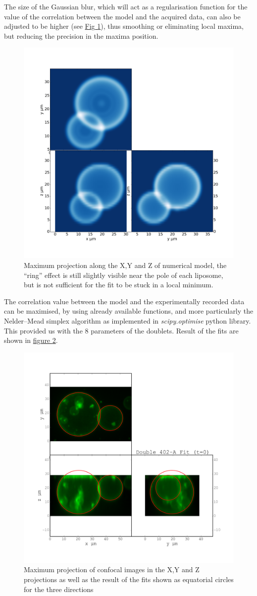 \documentclass[A4paperpaper,11pt,english]{sphinxmanual}
\begin{document}
The size of the
Gaussian blur, which will act as a regularisation
function for the value of the correlation between the model and the acquired
data, can also be adjusted to be higher (see \hyperref[parts/part4:max-proj-model]{Fig  \ref*{parts/part4:max-proj-model}}), thus smoothing or eliminating local maxima,
but reducing the precision in the maxima position.
\begin{figure}[htbp]
\centering
\capstart

\includegraphics[width=0.500\linewidth]{max_proj_model.png}
\caption{Maximum projection along the X,Y and Z of numerical model, the ``ring'' effect
is still slightly visible near the pole of each liposome, but is not
sufficient for the fit to be stuck in a local minimum.}\label{parts/part4:max-proj-model}\end{figure}

The correlation value between the model and the experimentally recorded
data can be maximised, by using already available functions, and more particularly the Nelder–Mead simplex algorithm as implemented in \emph{scipy.optimise} python library. This
provided us with the 8 parameters of the doublets. Result of the fits are shown in
\hyperref[parts/part4:fig-fit-t0]{figure  \ref*{parts/part4:fig-fit-t0}}.
\begin{figure}[htbp]
\centering
\capstart

\includegraphics[width=0.500\linewidth]{Doublet-402-A-Fit-t-0.png}
\caption{Maximum projection of confocal images in the X,Y and Z projections as well
as the result of the fits shown as equatorial circles for the three
directions}\label{parts/part4:fig-fit-t0}\end{figure}
\end{document}
